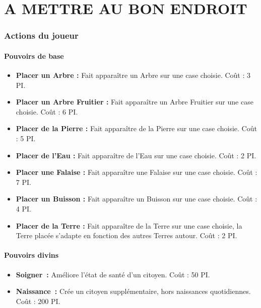 \documentclass[a4paper]{article}
\begin{document}

  \newpage
  \part{A METTRE AU BON ENDROIT}
    \section{Actions du joueur}

      \subsection{Pouvoirs de base}
        \begin{itemize}
          \item \textbf{Placer un Arbre :} \small{ Fait apparaître un Arbre sur une case choisie. Coût : 3 PI.}
          \item \textbf{Placer un Arbre Fruitier :} \small{ Fait apparaître un Arbre Fruitier sur une case choisie. Coût : 6 PI.}
          \item \textbf{Placer de la Pierre :} \small{ Fait apparaître de la Pierre sur une case choisie. Coût : 5 PI.}
          \item \textbf{Placer de l'Eau :} \small{ Fait apparaître de l'Eau sur une case choisie. Coût : 2 PI.}
          \item \textbf{Placer une Falaise :} \small{ Fait apparaître une Falaise sur une case choisie. Coût : 7 PI.}
          \item \textbf{Placer un Buisson :} \small{ Fait apparaître un Buisson sur une case choisie. Coût : 4 PI.}
          \item \textbf{Placer de la Terre :} \small{ Fait apparaître de la Terre sur une case choisie, la Terre placée s'adapte en fonction des autres Terres autour. Coût : 2 PI.}
        \end{itemize}

      \subsection{Pouvoirs divins}
        \begin{itemize}
          \item \textbf{Soigner :} \small{ Améliore l'état de santé d'un citoyen. Coût : 50 PI.}
          \item \textbf{Naissance :} \small{ Crée un citoyen supplémentaire, hors naissances quotidiennes. Coût : 200 PI.}
        \end{itemize}
\end{document}
